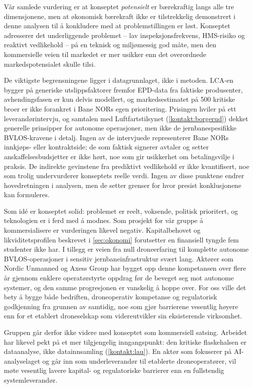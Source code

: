 Vår samlede vurdering er at konseptet \textit{potensielt} er bærekraftig langs alle tre dimensjonene, men at økonomisk bærekraft ikke er tilstrekkelig demonstrert i denne analysen til å konkludere med at problemstillingen er løst. Konseptet adresserer det underliggende problemet -- lav inspeksjonsfrekvens, HMS-risiko og reaktivt vedlikehold -- på en teknisk og miljømessig god måte, men den kommersielle veien til markedet er mer usikker enn det overordnede markedspotensialet skulle tilsi.

De viktigste begrensningene ligger i datagrunnlaget, ikke i metoden. LCA-en bygger på generiske utslippsfaktorer fremfor EPD-data fra faktiske produsenter, avhendingsfasen er kun delvis modellert, og markedsestimatet på 500 kritiske broer er ikke forankret i Bane NORs egen prioritering. Prisingen hviler på ett leverandørintervju, og samtalen med Luftfartstilsynet (\cref{kontakt:borgerud}) dekket generelle prinsipper for autonome operasjoner, men ikke de jernbanespesifikke BVLOS-kravene i detalj. Ingen av de intervjuede representerer Bane NORs innkjøps- eller kontraktside; de som faktisk signerer avtaler og setter anskaffelsesbudsjetter er ikke hørt, noe som gir usikkerhet om betalingsvilje i praksis. De indirekte gevinstene fra prediktivt vedlikehold er ikke kvantifisert, noe som trolig undervurderer konseptets reelle verdi. Ingen av disse punktene endrer hovedretningen i analysen, men de setter grenser for hvor presist konklusjonene kan formuleres.

Som idé er konseptet solid: problemet er reelt, voksende, politisk prioritert, og teknologien er i ferd med å modnes. Som prosjekt for vår gruppe å kommersialisere er vurderingen likevel negativ. Kapitalbehovet og likviditetsprofilen beskrevet i \cref{sec:okonomi} forutsetter en finansiell tyngde fem studenter ikke har. I tillegg er veien fra null droneerfaring til komplette autonome BVLOS-operasjoner i sensitiv jernbaneinfrastruktur svært lang. Aktører som Nordic Unmanned og Axess Group har bygget opp denne kompetansen over flere år gjennom enklere operatørstyrte oppdrag før de beveget seg mot autonome systemer, og den samme progresjonen er vanskelig å hoppe over. For oss ville det bety å bygge både bedriften, droneoperativ kompetanse og regulatorisk godkjenning fra grunnen av samtidig, noe som gjør barrierene vesentlig høyere enn for et etablert droneselskap som videreutvikler sin eksisterende virksomhet.

Gruppen går derfor ikke videre med konseptet som kommersiell satsing. Arbeidet har likevel pekt på et mer tilgjengelig inngangspunkt: den kritiske flaskehalsen er dataanalyse, ikke datainnsamling (\cref{kontakt:lau}). En aktør som fokuserer på AI-analyselaget og går inn som underleverandør til etablerte droneoperatører, vil møte vesentlig lavere kapital- og regulatoriske barrierer enn en fullstendig systemleverandør.